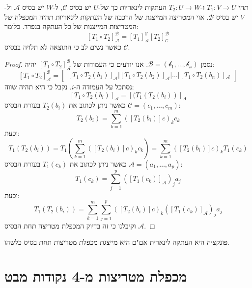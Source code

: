 \documentclass{tstextbook}
\begin{document}
\begin{proposition}
תהי \(T_{1}:V\to U\) ו-\(T_{2}:U\to W\) העתקות לינאריות כך של-\(U\) יש בסיס \(\mathcal{C}\), ל-\(W\) יש בסיס \(\mathcal{A}\) ול-\(V\) יש בסיס \(\mathcal{B}\). אזי המטריצה המייצגת של הרכבה של העתקות לינאריות תהיה המכפלה של המטריצות המייצגות של כל העתקה בנפרד. כלומר:
$$\left[ T_{1}\circ  T_{2} \right]_{\mathcal{A} }^{\mathcal{B} }=[T_{1}]_{\mathcal{A} }^{\mathcal{C} }[T_{2}]_{\mathcal{C} }^{\mathcal{B} }$$
כאשר נשים לב כי התוצאה לא תלויה בבסיס \(\mathcal{C}\).

\end{proposition}
\begin{proof}
נסמן \(\mathcal{B=\left( b_{1},\dots,b_{n} \right)}\).
אנו יודעים כי העמודות של \(\left[ T_{1}\circ T_{2} \right]_{\mathcal{A}}^{\mathcal{B}}\) יהיה:
$$\left[ T_{1}\circ T_{2} \right]_{\mathcal{A} }^{\mathcal{B} }=\begin{bmatrix}\left[ T_{1}\circ  T_{2}(b_{1}) \right]_{\mathcal{A} }\bigg| \left[ T_{1}\circ  T_{2}\left( b_{2} \right) \right]_{\mathcal{A} }\bigg|\dots \bigg| \left[ T_{1}\circ T_{2} (b_{n}) \right]\mathcal{_{A}}  
\end{bmatrix} $$
נסתכל על העמודה ה-\(i\). נקבל כי היא תהיה שווה:
$$\left[ T_{1}\circ T_{2}(b_{i}) \right]_{\mathcal{A} }=[(T_{1}(T_{2}(b_{i}))]_{A}$$
כאשר ניתן לכתוב את \(T_{2}(b_{i})\) בעזרת הבסיס \(\mathcal{C}=\left( c_{1},\dots,c_{m} \right)\):
$$T_{2}(b_{i})=\sum_{k=1}^{m}\left([T_{2}(b_{i})]c\right)_{k}c_{k}$$
וכעת:
$$T_{1}(T_{2}(b_{i}))=T_{1}\left(\sum_{k=1}^{m}\left([T_{2}(b_{i})]c\right)_{k}c_{k}\right)=\sum_{k=1}^{m}\left([T_{2}(b_{i})]c\right)_{k}T_{1}(c_{k})$$
כאשר ניתן לכתוב את \(T_{1}(c_{k})\) בעזרת הבסיס \(\mathcal{A}=\left( a_{1},\dots,a_{p} \right)\):
$$T_{1}(c_{k})=\sum_{j=1}^{p}\left([T_{1}(c_{k})]_{\mathcal{A}}\right)_{j}a_{j}$$
וכעת:
$$T_{1}(T_{2}(b_{i}))=\sum_{k=1}^{m}\sum_{j=1}^{p}\left([T_{2}(b_{i})]c\right)_{k}\left([T_{1}(c_{k})]_{\mathcal{A}}\right)_{j}a_{j}$$
וקיבלנו כי זה בדיוק המכפלת מטריצה תחת הבסיס \(\mathcal{ A}\).

\end{proof}
\begin{theorem}
פונקציה היא העתקה לינארית אם"ם היא מייצגת מכפלת מטריצות תחת בסיס כלשהו. 

\end{theorem}
\section{מכפלת מטריצות מ-4 נקודות מבט}
\end{document}
